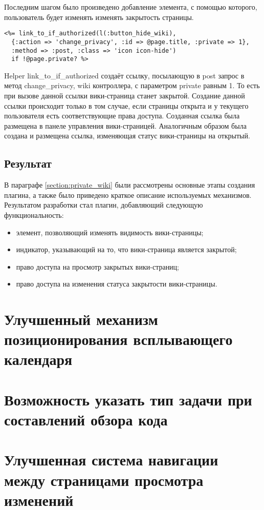 Последним шагом было произведено добавление элемента, с помощью которого,
пользователь будет изменять изменять закрытость страницы.
\small{\begin{lstlisting}
<%= link_to_if_authorized(l(:button_hide_wiki), 
  {:action => 'change_privacy', :id => @page.title, :private => 1}, 
  :method => :post, :class => 'icon icon-hide') 
  if !@page.private? %>
\end{lstlisting}}
Helper link_to_if_authorized создаёт ссылку, посылающую в post запрос в метод
change_privacy, wiki контроллера, с параметром private равным 1. То есть при
вызове данной ссылки вики-страница станет закрытой. Создание данной ссылки
происходит только в том случае, если страницы открыта и у текущего пользователя
есть соответствующие права доступа. Созданная ссылка была размещена в панеле
управления вики-страницей. Аналогичным образом была создана и размещена
ссылка, изменяющая статус вики-страницы на открытый.

\subsection{Результат}
В параграфе \ref{section:private_wiki} были рассмотрены основные этапы создания
плагина, а также было приведено краткое описание используемых механизмов.
Результатом разработки стал плагин, добавляющий следующую функциональность:
\begin{itemize}
  \item элемент, позволяющий изменять видимость вики-страницы;
  \item индикатор, указывающий на то, что вики-страница является закрытой;
  \item право доступа на просмотр закрытых вики-страниц;
  \item право доступа на изменения статуса закрытости вики-страницы.
\end{itemize}



\section{Улучшенный механизм позиционирования всплывающего календаря}

\section{Возможность указать тип задачи при составлений обзора кода}

\section{Улучшенная система навигации между страницами просмотра изменений}

